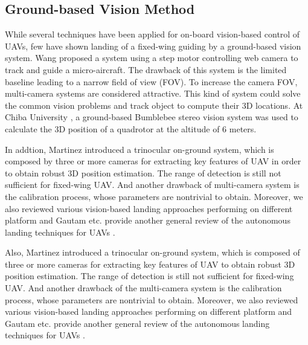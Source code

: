 \subsection{Ground-based Vision Method}
While several techniques have been applied for on-board vision-based control of UAVs, few have shown landing of a fixed-wing guiding by a ground-based vision system. Wang \cite{Wang2006} proposed a system using a step motor controlling web camera to track and guide a micro-aircraft. The drawback of this system is the limited baseline leading to a narrow field of view (FOV). To increase the camera FOV, multi-camera systems are considered attractive. This kind of system could solve the common vision problems and track object to compute their 3D locations. At Chiba University \cite{pebrianti2010autonomous}, a ground-based Bumblebee stereo vision system was used to calculate the 3D position of a quadrotor at the altitude of 6 meters. 

In addtion, Martinez \cite{Martinez2009a} introduced a trinocular on-ground system, which is composed by three or more cameras for extracting key features of UAV in order to obtain robust 3D position estimation. The range of detection is still not sufficient for fixed-wing UAV. And another drawback of multi-camera system is the calibration process, whose parameters are nontrivial to obtain. Moreover, we also reviewed various vision-based landing approaches performing on different platform \cite{kong2014vision} and Gautam etc. provide another general review of the autonomous landing techniques for UAVs \cite{Gautam2014}.

Also, Martinez \cite{Martinez2009a} introduced a trinocular on-ground system, which is composed of three or more cameras for extracting key features of UAV to obtain robust 3D position estimation. The range of detection is still not sufficient for fixed-wing UAV. And another drawback of the multi-camera system is the calibration process, whose parameters are nontrivial to obtain. Moreover, we also reviewed various vision-based landing approaches performing on different platform \cite{kong2014vision} and Gautam etc. provide another general review of the autonomous landing techniques for UAVs \cite{Gautam2014}.




